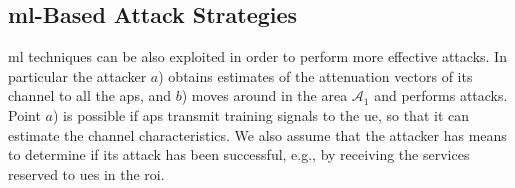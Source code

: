 \documentclass[draftcls,onecolumn,12pt]{IEEEtran}
\newcommand{\Exp}[1]{\mathbb{E}\left[#1\right]}
\begin{document}

\subsection{\ac{ml}-Based Attack Strategies}
\label{sec:attack}

\ac{ml} techniques can be also exploited in order to perform more effective attacks. In particular the attacker  $a$) obtains estimates of the attenuation vectors of its channel to all the \acp{ap}, and $b$) moves around in the area $\mathcal A_1$ and performs attacks. Point $a$) is possible if \acp{ap} transmit training signals to the \ac{ue}, so that it can estimate the channel characteristics. We also assume that the attacker has means to determine if its attack has been successful, e.g., by receiving the services reserved to \acp{ue} in the \ac{roi}.

\end{document}

